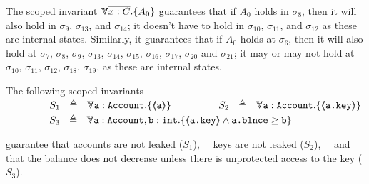 {{The scoped invariant   ${\TwoStatesN {\overline {x:C}} {A_0}}$   guarantees that  if $A_0$ holds in $\sigma_8$, then it will also hold in $\sigma_9$,    $\sigma_{13}$, and $\sigma_{14}$;
 it %
 doesn't have to hold in $\sigma_{10}$, $\sigma_{11}$,  and $\sigma_{12}$ as these are internal states.
Similarly, it guarantees that if $A_0$ holds at $\sigma_6$, then it will also hold at 
$\sigma_7$, $\sigma_8$, $\sigma_9$, $\sigma_{13}$,  $\sigma_{14}$,   $\sigma_{15}$,  $\sigma_{16}$, $\sigma_{17}$,   $\sigma_{20}$ and  $\sigma_{21}$; it may or may not hold at
$\sigma_{10}$, $\sigma_{11}$,  $\sigma_{12}$,  $\sigma_{18}$,  $\sigma_{19}$, as these are internal states.


 

    
\label{s:bank}

\begin{example}
\label{s:bankSpecEx}
The following scoped invariants\\
$\strut \SPSP\ \ \   S_1\ \  \triangleq \ \ \TwoStatesN {\prg{a}:\prg{Account}}  {\inside{\prg{a}}} $ 
\hspace{1.1cm}
$\strut  \SPSP\ \ \   S_2\ \  \triangleq \ \ \TwoStatesN  {\prg{a}:\prg{Account}}  {\inside{\prg{a.key}}} $ 
\\
$\strut  \SPSP\ \ \   S_3\ \  \triangleq \ \ \TwoStatesN{ \prg{a}:\prg{Account},\prg{b}:\prg{int} } {\inside{\prg{a.key}} \wedge \prg{a.\balance} \geq \prg{b} } $ 

\noindent
 guarantee that   accounts are not leaked  ($S_1$), \ \ keys are not leaked  ($S_2$), \ \  and that the balance does not decrease unless there is unprotected access to the key  ($S_3$).
%
\end{example} 

}}
